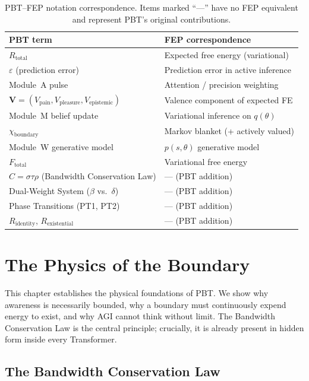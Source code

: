\documentclass[12pt,a4paper]{article}
\newcommand{\Rtot}{R_{\mathrm{total}}}
\newcommand{\Rid}{R_{\mathrm{identity}}}
\newcommand{\Rex}{R_{\mathrm{existential}}}
\newcommand{\vpain}{V_{\mathrm{pain}}}
\newcommand{\vpleasure}{V_{\mathrm{pleasure}}}
\newcommand{\vepi}{V_{\mathrm{epistemic}}}
\newcommand{\chiB}{\chi_{\mathrm{boundary}}}
\begin{document}
\begin{table}[ht]
\centering
\caption{PBT--FEP notation correspondence. Items marked ``---'' have no FEP
equivalent and represent PBT's original contributions.}
\label{tab:fep_mapping}
\small
\begin{tabular}{@{}L{5.5cm}L{7.0cm}@{}}
\toprule
\textbf{PBT term} & \textbf{FEP correspondence} \\
\midrule
$\Rtot$ & Expected free energy (variational) \\
$\varepsilon$ (prediction error) & Prediction error in active inference \\
Module~A pulse & Attention / precision weighting \\
$\mathbf{V} = (\vpain,\vpleasure,\vepi)$ & Valence component of expected FE \\
Module~M belief update & Variational inference on $q(\theta)$ \\
$\chiB$ & Markov blanket (+ actively valued) \\
Module~W generative model & $p(s,\theta)$ generative model \\
$F_{\mathrm{total}}$ & Variational free energy \\
$C = \sigma\tau\rho$ (Bandwidth Conservation Law) & --- (PBT addition) \\
Dual-Weight System ($\beta$ vs.\ $\delta$) & --- (PBT addition) \\
Phase Transitions (PT1, PT2) & --- (PBT addition) \\
$\Rid$, $\Rex$ & --- (PBT addition) \\
\bottomrule
\end{tabular}
\end{table}

\section{The Physics of the Boundary}
\label{sec:physics}

This chapter establishes the physical foundations of PBT. We show why
awareness is necessarily bounded, why a boundary must continuously expend
energy to exist, and why AGI cannot think without limit. The Bandwidth
Conservation Law is the central principle; crucially, it is already present
in hidden form inside every Transformer.

\subsection{The Bandwidth Conservation Law}
\end{document}
